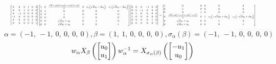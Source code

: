 \documentclass[11pt]{article}
\theoremstyle{definition}
\begin{document}
\[
\scaletoalign{\textwidth}{{\left[\begin{matrix}0 & 0 & 0 & 1 & 0 & 0\\0 & 0 & 1 & 0 & 0 & 0\\0 & -1 & 0 & 0 & 0 & 0\\-1 & 0 & 0 & 0 & 0 & 0\\0 & 0 & 0 & 0 & 1 & 0\\0 & 0 & 0 & 0 & 0 & 1\end{matrix}\right]} {\left[\begin{matrix}1 & 0 & \frac{\sqrt{d} \left(- c_{0} d u_{1}^{2} + c_{0} u_{0}^{2} - c_{1} d u_{3}^{2} + c_{1} u_{2}^{2}\right)}{2} & 0 & c_{0} \left(\sqrt{d} u_{0} - d u_{1}\right) & c_{1} \left(\sqrt{d} u_{2} - d u_{3}\right)\\0 & 1 & 0 & 0 & 0 & 0\\0 & 0 & 1 & 0 & 0 & 0\\0 & 0 & 0 & 1 & 0 & 0\\0 & 0 & \sqrt{d} u_{1} + u_{0} & 0 & 1 & 0\\0 & 0 & \sqrt{d} u_{3} + u_{2} & 0 & 0 & 1\end{matrix}\right]} {\left[\begin{matrix}0 & 0 & 0 & -1 & 0 & 0\\0 & 0 & -1 & 0 & 0 & 0\\0 & 1 & 0 & 0 & 0 & 0\\1 & 0 & 0 & 0 & 0 & 0\\0 & 0 & 0 & 0 & 1 & 0\\0 & 0 & 0 & 0 & 0 & 1\end{matrix}\right]} = {\left[\begin{matrix}1 & 0 & 0 & 0 & 0 & 0\\0 & 1 & 0 & 0 & 0 & 0\\0 & 0 & 1 & 0 & 0 & 0\\0 & \frac{\sqrt{d} \left(c_{0} d u_{1}^{2} - c_{0} u_{0}^{2} + c_{1} d u_{3}^{2} - c_{1} u_{2}^{2}\right)}{2} & 0 & 1 & c_{0} \left(- \sqrt{d} u_{0} + d u_{1}\right) & c_{1} \left(- \sqrt{d} u_{2} + d u_{3}\right)\\0 & \sqrt{d} u_{1} + u_{0} & 0 & 0 & 1 & 0\\0 & \sqrt{d} u_{3} + u_{2} & 0 & 0 & 0 & 1\end{matrix}\right]}}
\]
\[
\alpha = \left( -1, \  -1, \  0, \  0, \  0, \  0\right), \beta = \left( 1, \  1, \  0, \  0, \  0, \  0\right), \sigma_{\alpha}(\beta) = \left( -1, \  -1, \  0, \  0, \  0, \  0\right)
\]
\[
\scaletoalign{\textwidth}{w_{\alpha} X_{\beta}\left(\left[\begin{matrix}u_{0}\\u_{1}\end{matrix}\right]\right) w_{\alpha}^{-1} = X_{\sigma_{\alpha}\left(\beta\right)}\left(\left[\begin{matrix}- u_{1}\\u_{0}\end{matrix}\right]\right)}
\]
\end{document}
